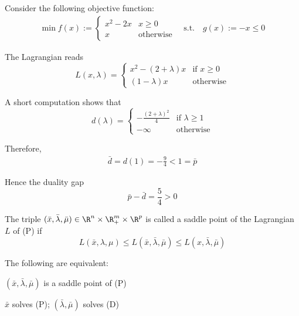 Consider the following objective function:
\begin{align*}
  \min f(x):=\begin{cases}
               x^2-2x & x\geq0           \\
               x      & \text{otherwise}
             \end{cases}
  \quad \text{s.t.}\quad g(x):=-x\leq0
\end{align*}


The Lagrangian reads
$$
  L(x,\lambda)=\begin{cases}
    x^2-(2+\lambda)x & \text{if } x\geq0 \\
    (1-\lambda)x     & \text{otherwise}
  \end{cases}
$$

A short computation shows that
$$
  d(\lambda)=\begin{cases}
    -\frac{(2+\lambda)^2}{4} & \text{if }\lambda\geq1 \\
    -\infty                  & \text{otherwise}
  \end{cases}
$$

Therefore,
\begin{align*}
  \bar d=d(1)=-\frac94<1=\bar p
\end{align*}

Hence the duality gap
$$
  \bar p-\bar d=\frac54>0
$$

\label{e1525d8}

The triple $(\bar x,\bar\lambda,\bar\mu)\in\R^n\times\R^m_+\times\R^p$ is
called a saddle point of the Lagrangian $L$ of (P) if
$$
  L(\bar x,\lambda,\mu)\leq
  L(\bar x,\bar\lambda,\bar\mu)\leq
  L(x,\bar\lambda,\bar\mu)
$$

\label{dc4af95}

The following are equivalent:
\begin{enumerati}
  \item $(\bar x,\bar\lambda,\bar\mu)$ is a saddle point of (P)
  \item $\bar x$ solves (P); $(\bar\lambda,\bar\mu)$ solves (D)
\end{enumerati}

